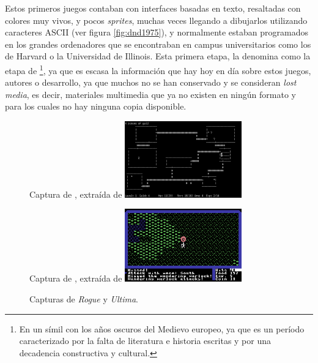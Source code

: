 \smallskip

Estos primeros juegos contaban con interfaces basadas en texto, resaltadas con colores muy vivos, y pocos \textit{sprites}, muchas veces llegando a dibujarlos utilizando caracteres ASCII (ver figura \ref{fig:dnd1975}), y normalmente estaban programados en los grandes ordenadores que se encontraban en campus universitarios como los de Harvard o la Universidad de Illinois. Esta primera etapa, \cite{barton2008dungeons} la denomina como la etapa de \footnote{En un símil con los años oscuros del Medievo europeo, ya que es un período caracterizado por la falta de literatura e historia escritas y por una decadencia constructiva y cultural.}, ya que es escasa la información que hay hoy en día sobre estos juegos, autores o desarrollo, ya que muchos no se han conservado y se consideran \textit{lost media}, es decir, materiales multimedia que ya no existen en ningún formato y para los cuales no hay ninguna copia disponible.

\smallskip

\begin{figure}[t]
	\centering
	\begin{SubFloat}
		{\label{fig:rogue}%
		Captura de \cite{rogue}, extraída de \cite{rogueimg}}%
		\includegraphics[width=0.45\textwidth]{Imagenes/Bitmap/rogue}%
	\end{SubFloat}
	\qquad
	\begin{SubFloat}
		{\label{fig:ultima}%
		Captura de \cite{ultima}, extraída de \cite{ultimaimg}}%
		\includegraphics[width=0.45\textwidth]{Imagenes/Bitmap/ultima}%
	\end{SubFloat}
	\caption{Capturas de \textit{Rogue} y \textit{Ultima}. \label{fig:rogueultima}}
\end{figure}


